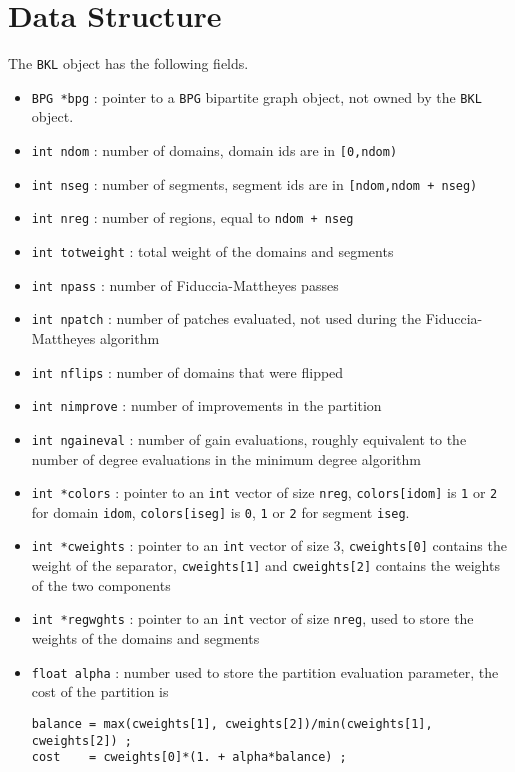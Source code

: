 \par
\section{Data Structure}
\label{section:BKL:dataStructure}
\par
The {\tt BKL} object has the following fields.
\begin{itemize}
\item 
{\tt BPG *bpg} : pointer to a {\tt BPG} bipartite graph object,
not owned by the {\tt BKL} object.
\item 
{\tt int ndom} : number of domains, domain ids are in {\tt [0,ndom)}
\item 
{\tt int nseg} : number of segments, 
             segment ids are in {\tt [ndom,ndom + nseg)}
\item 
{\tt int nreg} : number of regions, equal to {\tt ndom + nseg}
\item 
{\tt int totweight} : total weight of the domains and segments
\item 
{\tt int npass} : number of Fiduccia-Mattheyes passes
\item 
{\tt int npatch} : number of patches evaluated, not used during the
Fiduccia-Mattheyes algorithm
\item 
{\tt int nflips} : number of domains that were flipped
\item 
{\tt int nimprove} : number of improvements in the partition
\item 
{\tt int ngaineval} : number of gain evaluations, roughly equivalent to
the number of degree evaluations in the minimum degree algorithm
\item 
{\tt int *colors} : pointer to an {\tt int} vector of size {\tt nreg}, 
{\tt colors[idom]} is {\tt 1} or {\tt 2} for domain {\tt idom},
{\tt colors[iseg]} is {\tt 0}, {\tt 1} or {\tt 2} 
  for segment {\tt iseg}.
\item 
{\tt int *cweights} : pointer to an {\tt int} vector of size 3, 
                 {\tt cweights[0]} contains the weight of the separator,
                 {\tt cweights[1]} and {\tt cweights[2]} contains the 
                 weights of the two components
\item 
{\tt int *regwghts} : 
pointer to an {\tt int} vector of size {\tt nreg}, 
used to store the weights of the domains and segments
\item 
{\tt float alpha} : number used to store the partition
evaluation parameter, the cost of the partition is
\begin{verbatim}
balance = max(cweights[1], cweights[2])/min(cweights[1], cweights[2]) ;
cost    = cweights[0]*(1. + alpha*balance) ;
\end{verbatim}
\end{itemize}
